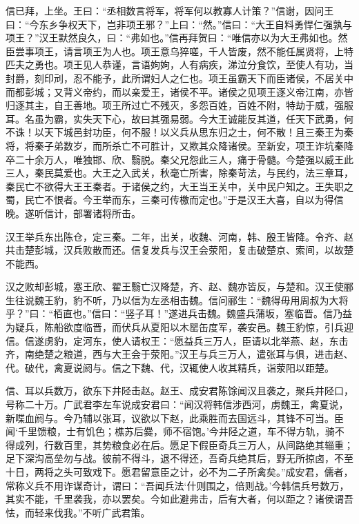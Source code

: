 \documentclass[12pt,UTF8]{ctexbook}
\begin{document}
信已拜，上坐。王曰：“丞相数言将军，将军何以教寡人计策？”信谢，因问王曰：“今东乡争权天下，岂非项王邪？”上曰：“然。”信曰：“大王自料勇悍仁强孰与项王？”汉王默然良久，曰：“弗如也。”信再拜贺曰：“唯信亦以为大王弗如也。然臣尝事项王，请言项王为人也。项王意乌猝嗟，千人皆废，然不能任属贤将，上特匹夫之勇也。项王见人恭谨，言语姁姁，人有病疾，涕泣分食饮，至使人有功，当封爵，刻印刓，忍不能予，此所谓妇人之仁也。项王虽霸天下而臣诸侯，不居关中而都彭城；又背义帝约，而以亲爱王，诸侯不平。诸侯之见项王逐义帝江南，亦皆归逐其主，自王善地。项王所过亡不残灭，多怨百姓，百姓不附，特劫于威，强服耳。名虽为霸，实失天下心，故曰其强易弱。今大王诚能反其道，任天下武勇，何不诛！以天下城邑封功臣，何不服！以义兵从思东归之士，何不散！且三秦王为秦将，将秦子弟数岁，而所杀亡不可胜计，又欺其众降诸侯。至新安，项王诈坑秦降卒二十余万人，唯独邯、欣、翳脱。秦父兄怨此三人，痛于骨髓。今楚强以威王此三人，秦民莫爱也。大王之入武关，秋毫亡所害，除秦苛法，与民约，法三章耳，秦民亡不欲得大王王秦者。于诸侯之约，大王当王关中，关中民户知之。王失职之蜀，民亡不恨者。今王举而东，三秦可传檄而定也。”于是汉王大喜，自以为得信晚。遂听信计，部署诸将所击。



汉王举兵东出陈仓，定三秦。二年，出关，收魏、河南，韩、殷王皆降。令齐、赵共击楚彭城，汉兵败散而还。信复发兵与汉王会荥阳，复击破楚京、索间，以故楚不能西。



汉之败却彭城，塞王欣、翟王翳亡汉降楚，齐、赵、魏亦皆反，与楚和。汉王使郦生往说魏王豹，豹不听，乃以信为左丞相击魏。信问郦生：“魏得毋用周叔为大将乎？”曰：“栢直也。”信曰：“竖子耳！”遂进兵击魏。魏盛兵蒲坂，塞临晋。信乃益为疑兵，陈船欲度临晋，而伏兵从夏阳以木罂缶度军，袭安邑。魏王豹惊，引兵迎信。信遂虏豹，定河东，使人请权王：“愿益兵三万人，臣请以北举燕、赵，东击齐，南绝楚之粮道，西与大王会于荥阳。”汉王与兵三万人，遣张耳与俱，进击赵、代。破代，禽夏说阏与。信之下魏、代，汉辄使人收其精兵，诣荥阳以距楚。



信、耳以兵数万，欲东下井陉击赵。赵王、成安君陈馀闻汉且袭之，聚兵井陉口，号称二十万。广武君李左车说成安君曰：“闻汉将韩信涉西河，虏魏王，禽夏说，新喋血阏与。今乃辅以张耳，议欲以下赵，此乘胜而去国远斗，其锋不可当。臣闻‘千里馈粮，士有饥色；樵苏后爨，师不宿饱。’今井陉之道，车不得方轨，骑不得成列，行数百里，其势粮食必在后。愿足下假臣奇兵三万人，从间路绝其辎重；足下深沟高垒勿与战。彼前不得斗，退不得还，吾奇兵绝其后，野无所掠卤，不至十日，两将之头可致戏下。愿君留意臣之计，必不为二子所禽矣。”成安君，儒者，常称义兵不用诈谋奇计，谓曰：“吾闻兵法‘什则围之，倍则战。’今韩信兵号数万，其实不能，千里袭我，亦以罢矣。今如此避弗击，后有大者，何以距之？诸侯谓吾怯，而轻来伐我。”不听广武君策。
\end{document}
